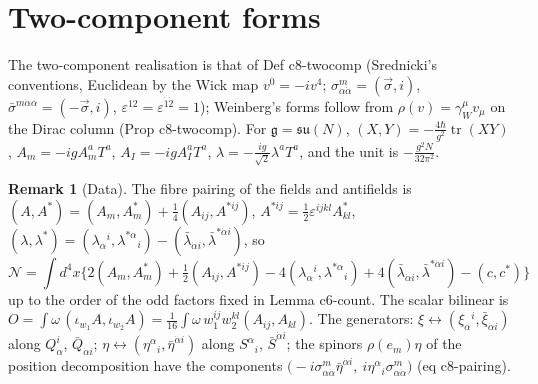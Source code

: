 \documentclass[11pt]{article}
\numberwithin{equation}{section}
\theoremstyle{plain}
\theoremstyle{definition}
\newtheorem{remark}[theorem]{Remark}
\newcommand{\Fc}{\mathcal N}
\begin{document}
\section{Two-component forms}
\label{sec:op-twocomp}

The two-component realisation is that of Def c8-twocomp (Srednicki's conventions, Euclidean by the Wick map $v^0=-iv^4$; $\sigma^m_{\alpha\dot\alpha}=(\vec\sigma,i)$, $\bar\sigma^{m\dot\alpha\alpha}=(-\vec\sigma,i)$, $\varepsilon^{12}=\varepsilon^{\dot1\dot2}=1$); Weinberg's forms follow from $\rho(v)=\gamma_W^\mu v_\mu$ on the Dirac column (Prop c8-twocomp). For $\mathfrak g=\mathfrak{su}(N)$, $(X,Y)=-\tfrac{4\hbar}{g^2}\operatorname{tr}(XY)$, $A_m=-igA^a_mT^a$, $A_I=-igA^a_IT^a$, $\lambda=-\tfrac{ig}{\sqrt2}\lambda^aT^a$, and the unit is $-\tfrac{g^2N}{32\pi^2}$.

\begin{remark}[Data]
\label{rem:op-tc-data}
The fibre pairing of the fields and antifields is $(A,A^*)=(A_m,A^*_m)+\tfrac14(A_{ij},A^{*ij})$, $A^{*ij}=\tfrac12\varepsilon^{ijkl}A^*_{kl}$, $(\lambda,\lambda^*)=(\lambda_\alpha{}^i,\lambda^{*\alpha}{}_i)-(\bar\lambda_{\dot\alpha i},\bar\lambda^{*\dot\alpha i})$, so
\[
\Fc=\int d^4x\Big\{2(A_m,A^*_m)+\tfrac12(A_{ij},A^{*ij})-4(\lambda_\alpha{}^i,\lambda^{*\alpha}{}_i)+4(\bar\lambda_{\dot\alpha i},\bar\lambda^{*\dot\alpha i})-(c,c^*)\Big\}
\]
up to the order of the odd factors fixed in Lemma c6-count. The scalar bilinear is $O=\int\omega\,(\iota_{w_1}A,\iota_{w_2}A)=\tfrac1{16}\int\omega\,w_1^{ij}w_2^{kl}(A_{ij},A_{kl})$. The generators: $\xi\leftrightarrow(\xi_\alpha{}^i,\bar\xi_{\dot\alpha i})$ along $Q^i_\alpha$, $\bar Q_{\dot\alpha i}$; $\eta\leftrightarrow(\eta^\alpha{}_i,\bar\eta^{\dot\alpha i})$ along $S^\alpha{}_i$, $\bar S^{\dot\alpha i}$; the spinors $\rho(e_m)\eta$ of the position decomposition have the components $\big(-i\sigma^m_{\alpha\dot\alpha}\bar\eta^{\dot\alpha i},\ i\eta^\alpha{}_i\sigma^m_{\alpha\dot\alpha}\big)$ (eq c8-pairing).
\end{remark}
\end{document}
